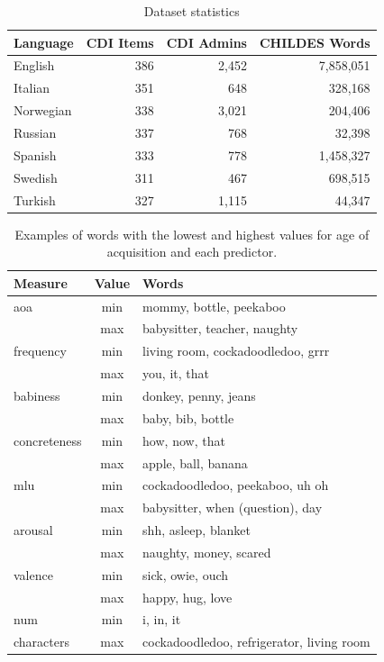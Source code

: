 \documentclass[10pt, letterpaper]{article}
\begin{document}
\begin{table}[t]
\centering
\begin{tabular}{lrrr}
  \hline
Language & CDI Items & CDI Admins & CHILDES Words \\ 
  \hline
English & 386 & 2,452 & 7,858,051 \\ 
  Italian & 351 & 648 & 328,168 \\ 
  Norwegian & 338 & 3,021 & 204,406 \\ 
  Russian & 337 & 768 & 32,398 \\ 
  Spanish & 333 & 778 & 1,458,327 \\ 
  Swedish & 311 & 467 & 698,515 \\ 
  Turkish & 327 & 1,115 & 44,347 \\ 
   \hline
\end{tabular}
\caption{Dataset statistics} 
\end{table}

\setlength\tabcolsep{1pt}

\begin{table}[!hb]
\centering
\begin{tabular}{lcl}
  \hline
Measure & Value & Words \\ 
  \hline
aoa & min & mommy, bottle, peekaboo \\ 
   & max & babysitter, teacher, naughty \\ 
  frequency & min & living room, cockadoodledoo, grrr \\ 
   & max & you, it, that \\ 
  babiness & min & donkey, penny, jeans \\ 
   & max & baby, bib, bottle \\ 
  concreteness & min & how, now, that \\ 
   & max & apple, ball, banana \\ 
  mlu & min & cockadoodledoo, peekaboo, uh oh \\ 
   & max & babysitter, when (question), day \\ 
  arousal & min & shh, asleep, blanket \\ 
   & max & naughty, money, scared \\ 
  valence & min & sick, owie, ouch \\ 
   & max & happy, hug, love \\ 
  num & min & i, in, it \\ 
  characters & max & cockadoodledoo, refrigerator, living room \\ 
   \hline
\end{tabular}
\caption{Examples of words with the lowest and highest values for age of acquisition and each predictor.} 
\label{tab:mytable}
\end{table}
\end{document}
